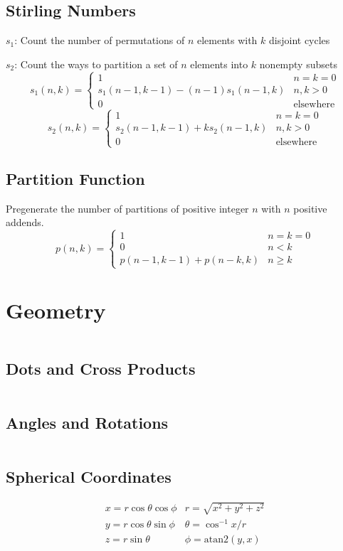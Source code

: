 \documentclass[8pt,a4paper,landscape,oneside]{amsart}
\newcommand{\code}[1]{\inputminted[fontsize=\normalsize,baselinestretch=1]{cpp}{_code/#1}}
\begin{document}
\begin{multicols*}{3}
  \subsection{Stirling Numbers}
    $s_1$: Count the number of permutations of $n$ elements with $k$ disjoint cycles

    $s_2$: Count the ways to partition a set of $n$ elements into $k$ nonempty subsets
    \[
    s_1(n,k) = \begin{cases}
        1 & n = k = 0 \\
        s_1(n-1,k-1) - (n-1) s_1(n-1,k) & n,k>0 \\
        0 & \text{elsewhere}
    \end{cases}
    \]
    \[
    s_2(n,k) = \begin{cases}
        1 & n = k = 0 \\
        s_2(n-1,k-1) + k s_2(n-1,k) & n,k>0 \\
        0 & \text{elsewhere}
    \end{cases}
    \]
  \subsection{Partition Function}
    Pregenerate the number of partitions of positive integer $n$ with $n$ positive addends.
    \[
    p(n,k) = \begin{cases}
        1 & n = k = 0 \\
        0 & n < k \\
        p(n-1,k-1) + p(n-k,k) & n \ge k
    \end{cases}
    \]
\section{Geometry}
  \code{geom/compgeom.cpp}
	\subsection{Dots and Cross Products}
    \code{geom/dot-cross.cpp}
  \subsection{Angles and Rotations}
    \code{geom/angles-rots.cpp}
	\subsection{Spherical Coordinates}
    \[
        \begin{array}{cc}
            x = r \cos \theta \cos \phi & r = \sqrt{x^2 + y^2 + z^2} \\
            y = r \cos \theta \sin \phi & \theta = \cos^{-1} x/r \\
            z = r \sin \theta & \phi = \mathrm{atan2}(y,x)
        \end{array}
    \]

\end{multicols*}
\end{document}
